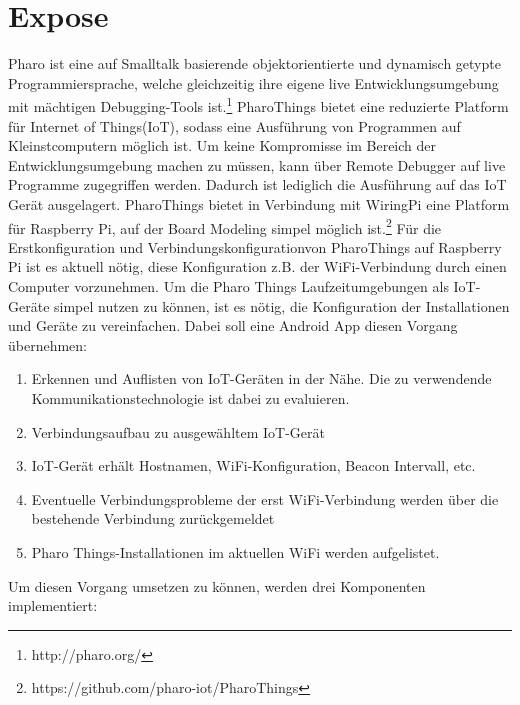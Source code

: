 \documentclass[12pt,a4paper]{article}
\begin{document}
    \section{Expose}
        Pharo ist eine auf Smalltalk basierende objektorientierte und dynamisch getypte Programmiersprache, welche gleichzeitig ihre eigene live Entwicklungsumgebung mit mächtigen Debugging-Tools ist.\footnote{http://pharo.org/}
        PharoThings bietet eine reduzierte Platform für  Internet of Things(IoT), sodass eine Ausführung von Programmen auf Kleinstcomputern möglich ist. Um keine Kompromisse im Bereich der Entwicklungsumgebung machen zu müssen, kann über Remote Debugger auf live Programme zugegriffen werden. Dadurch ist lediglich die Ausführung auf das IoT Gerät ausgelagert. PharoThings bietet in Verbindung mit WiringPi eine Platform für Raspberry Pi, auf der Board Modeling simpel möglich ist.\footnote{https://github.com/pharo-iot/PharoThings}
        Für die Erstkonfiguration und Verbindungskonfigurationvon PharoThings auf Raspberry Pi ist es aktuell nötig, diese Konfiguration z.B. der WiFi-Verbindung durch einen Computer vorzunehmen. Um die Pharo Things Laufzeitumgebungen als IoT-Geräte simpel nutzen zu können, ist es nötig, die Konfiguration der Installationen und Geräte zu vereinfachen. Dabei soll eine Android App diesen Vorgang übernehmen:
        \begin{enumerate}
            \item Erkennen und Auflisten von IoT-Geräten in der Nähe. Die zu verwendende Kommunikationstechnologie ist dabei zu evaluieren.
            \item Verbindungsaufbau zu ausgewähltem IoT-Gerät
            \item IoT-Gerät erhält Hostnamen, WiFi-Konfiguration, Beacon Intervall, etc.
            \item Eventuelle Verbindungsprobleme der erst WiFi-Verbindung werden über die bestehende Verbindung zurückgemeldet
            \item Pharo Things-Installationen im aktuellen WiFi werden aufgelistet.
        \end{enumerate}
        Um diesen Vorgang umsetzen zu können, werden drei Komponenten implementiert:
\end{document}
